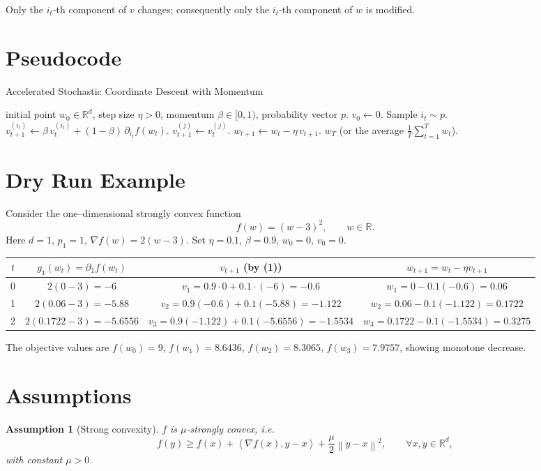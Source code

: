 \documentclass{article}
\newtheorem{assumption}{Assumption}
\newcommand{\R}{\mathbb{R}}
\newcommand{\norm}[1]{\left\|#1\right\|}
\newcommand{\ip}[2]{\left\langle #1,#2\right\rangle}
\begin{document}
Only the $i_t$‑th component of $v$ changes; consequently only the $i_t$‑th component of $w$ is modified.

\section*{Pseudocode}
\begin{algorithm}[H]
\caption{Accelerated Stochastic Coordinate Descent with Momentum}
\begin{algorithmic}[1]
\REQUIRE initial point $w_{0}\in\R^{d}$, step size $\eta>0$, momentum $\beta\in[0,1)$, probability vector $p$.
\STATE $v_{0}\gets 0$.
    \STATE Sample $i_t\sim p$.
    \STATE $v_{t+1}^{(i_t)} \gets \beta\,v_{t}^{(i_t)}+(1-\beta)\,\partial_{i_t}f(w_t)$.
            \STATE $v_{t+1}^{(j)}\gets v_{t}^{(j)}$.
        \ENDIF
    \ENDFOR
    \STATE $w_{t+1}\gets w_{t}-\eta\,v_{t+1}$.
\ENDFOR
\RETURN $w_T$ (or the average $\frac1T\sum_{t=1}^{T}w_t$).
\end{algorithmic}
\end{algorithm}

\section*{Dry Run Example}
Consider the one–dimensional strongly convex function
\[
f(w)=(w-3)^2,\qquad w\in\R .
\]
Here $d=1$, $p_1=1$, $\nabla f(w)=2(w-3)$.  
Set $\eta=0.1$, $\beta=0.9$, $w_0=0$, $v_0=0$.

\begin{center}
\begin{tabular}{c|c|c|c}
$t$ & $g_1(w_t)=\partial_1 f(w_t)$ & $v_{t+1}$ (by (1)) & $w_{t+1}=w_t-\eta v_{t+1}$ \\ \hline
0 & $2(0-3)=-6$ & $v_1=0.9\cdot0+0.1\cdot(-6)=-0.6$ & $w_1=0-0.1(-0.6)=0.06$ \\[2mm]
1 & $2(0.06-3)=-5.88$ & $v_2=0.9(-0.6)+0.1(-5.88)=-1.122$ & $w_2=0.06-0.1(-1.122)=0.1722$ \\[2mm]
2 & $2(0.1722-3)=-5.6556$ & $v_3=0.9(-1.122)+0.1(-5.6556)=-1.5534$ & $w_3=0.1722-0.1(-1.5534)=0.3275$ 
\end{tabular}
\end{center}
The objective values are $f(w_0)=9$, $f(w_1)=8.6436$, $f(w_2)=8.3065$, $f(w_3)=7.9757$, showing monotone decrease.

\newpage

\section*{Assumptions}
\begin{assumption}[Strong convexity]\label{ass:strong}
$f$ is $\mu$‑strongly convex, i.e.
\[
f(y)\ge f(x)+\ip{\nabla f(x)}{y-x}+\frac{\mu}{2}\norm{y-x}^{2},
\qquad\forall x,y\in\R^{d},
\]
with constant $\mu>0$.
\end{assumption}
\end{document}
